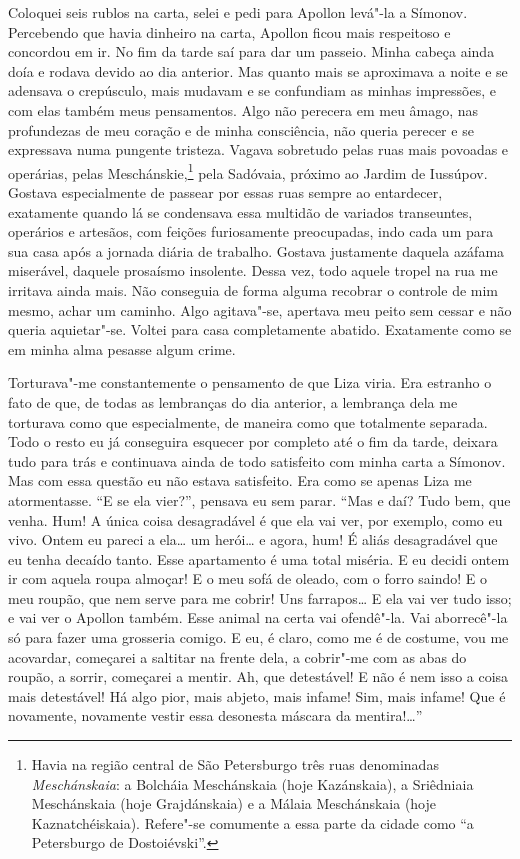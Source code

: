 Coloquei seis rublos na carta, selei e pedi para Apollon levá"-la a
Símonov. Percebendo que havia dinheiro na carta, Apollon ficou mais
respeitoso e concordou em ir. No fim da tarde saí para dar um passeio.
Minha cabeça ainda doía e rodava devido ao dia anterior. Mas quanto
mais se aproximava a noite e se adensava o crepúsculo, mais mudavam e
se confundiam as minhas impressões, e com elas também meus pensamentos.
Algo não perecera em meu âmago, nas profundezas de meu coração e de
minha consciência, não queria perecer e se expressava numa pungente
tristeza. Vagava sobretudo pelas ruas mais povoadas e operárias, pelas
Meschánskie,\footnote{ Havia na região central de São Petersburgo três
ruas denominadas \textit{Meschánskaia}: a Bolcháia Meschánskaia (hoje
Kazánskaia), a Sriêdniaia Meschánskaia (hoje Grajdánskaia) e a Málaia
Meschánskaia (hoje Kaznatchéiskaia). Refere"-se comumente a essa parte
da cidade como “a Petersburgo de Dostoiévski”.} pela Sadóvaia, próximo
ao Jardim de Iussúpov. Gostava especialmente de passear por essas ruas
sempre ao entardecer, exatamente quando lá se condensava essa multidão
de variados transeuntes, operários e artesãos, com feições furiosamente
preocupadas, indo cada um para sua casa após a jornada diária de
trabalho. Gostava justamente daquela azáfama miserável, daquele
prosaísmo insolente. Dessa vez, todo aquele tropel na rua me irritava
ainda mais. Não conseguia de forma alguma recobrar o controle de mim
mesmo, achar um caminho. Algo agitava"-se, apertava meu peito sem cessar
e não queria aquietar"-se. Voltei para casa completamente abatido.
Exatamente como se em minha alma pesasse algum crime.

Torturava"-me constantemente o pensamento de que Liza viria. Era estranho
o fato de que, de todas as lembranças do dia anterior, a lembrança dela
me torturava como que especialmente, de maneira como que totalmente
separada. Todo o resto eu já conseguira esquecer por completo até o fim
da tarde, deixara tudo para trás e continuava ainda de todo satisfeito
com minha carta a Símonov. Mas com essa questão eu não estava
satisfeito. Era como se apenas Liza me atormentasse. “E se ela vier?”,
pensava eu sem parar. “Mas e daí? Tudo bem, que venha. Hum! A única
coisa desagradável é que ela vai ver, por exemplo, como eu vivo. Ontem
eu pareci a ela\ldots{} um herói\ldots{} e agora, hum! É aliás desagradável que eu
tenha decaído tanto. Esse apartamento é uma total miséria. E eu decidi
ontem ir com aquela roupa almoçar! E o meu sofá de oleado, com o forro
saindo! E o meu roupão, que nem serve para me cobrir! Uns farrapos\ldots{} E
ela vai ver tudo isso; e vai ver o Apollon também. Esse animal na certa
vai ofendê"-la. Vai aborrecê"-la só para fazer uma grosseria comigo. E
eu, é claro, como me é de costume, vou me acovardar, começarei a
saltitar na frente dela, a cobrir"-me com as abas do roupão, a sorrir,
começarei a mentir. Ah, que detestável! E não é nem isso a coisa mais
detestável! Há algo pior, mais abjeto, mais infame! Sim, mais infame!
Que é novamente, novamente vestir essa desonesta máscara da
mentira!\ldots{}”

